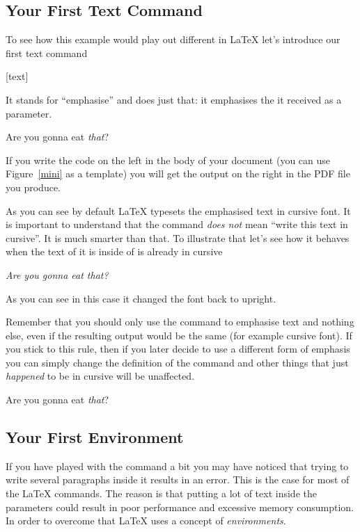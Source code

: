 \subsection{Your First Text Command}

To see how this example would play out different in \LaTeX{} let's introduce
our first text command
\begin{lscommand}
  [text]
\end{lscommand}
It stands for \enquote{emphasise} and does just that: it emphasises the
 it received as a parameter.
\begin{example}
Are you gonna eat \emph{that}?
\end{example}
If you write the code on the left in the body of your document (you can use
Figure~\ref{mini} as a template) you will get the output on the right in the
PDF file you produce.

As you can see by default \LaTeX{} typesets the emphasised text in cursive
font. It is important to understand that the  command \emph{does not}
mean \enquote{write this text in cursive}. It is much smarter than that. To
illustrate that let's see how it behaves when the text of it is inside of is
already in cursive
\begin{example}
  \itshape%
Are you gonna eat \emph{that}?
\end{example}
As you can see in this case it changed the font back to upright.

Remember that you should only use the  command to emphasise text and
nothing else, even if the resulting output would be the same (for example
cursive font). If you stick to this rule, then if you later decide to use a
different form of emphasis you can simply change the definition of the
 command and other things that just \emph{happened} to be in cursive
will be unaffected.
\begin{example}
  \RenewCommandCopy{\emph}{\strong}%
Are you gonna eat \emph{that}?
\end{example}

\subsection{Your First Environment}

If you have played with the  command a bit you may have noticed that
trying to write several paragraphs inside it results in an error. This is the
case for most of the \LaTeX{} commands. The reason is that putting a lot of
text inside the parameters could result in poor performance and excessive
memory consumption. In order to overcome that \LaTeX{} uses a concept of
\emph{environments}.

